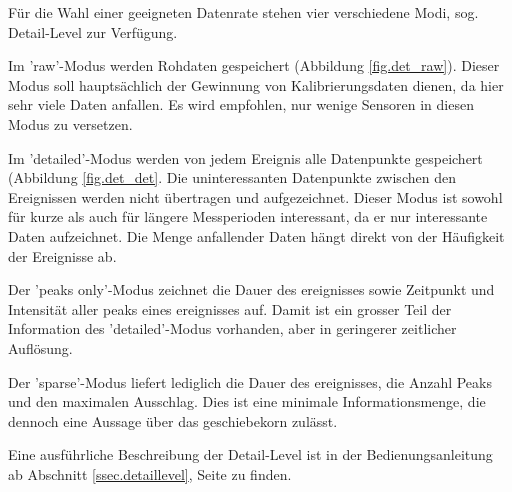 Für die Wahl einer geeigneten Datenrate stehen vier verschiedene Modi, sog. Detail-Level zur Verfügung. 

Im 'raw'-Modus werden Rohdaten gespeichert (Abbildung \ref{fig.det_raw}). Dieser Modus soll hauptsächlich der Gewinnung von Kalibrierungsdaten dienen, da hier sehr viele Daten anfallen. Es wird empfohlen, nur wenige Sensoren in diesen Modus zu versetzen.

Im 'detailed'-Modus werden von jedem Ereignis alle Datenpunkte gespeichert (Abbildung \ref{fig.det_det}. Die uninteressanten Datenpunkte zwischen den Ereignissen werden nicht übertragen und aufgezeichnet. Dieser Modus ist sowohl für kurze als auch für längere Messperioden interessant, da er nur interessante Daten aufzeichnet. Die Menge anfallender Daten hängt direkt von der Häufigkeit der Ereignisse ab.

Der 'peaks only'-Modus zeichnet die Dauer des \gls{ereignis}ses sowie Zeitpunkt und Intensität aller \gls{peak}s eines \gls{ereignis}ses auf. Damit ist ein grosser Teil der Information des 'detailed'-Modus vorhanden, aber in geringerer zeitlicher Auflösung.

Der 'sparse'-Modus liefert lediglich die Dauer des \gls{ereignis}ses, die Anzahl Peaks und den maximalen Ausschlag. Dies ist eine minimale Informationsmenge, die dennoch eine Aussage über das \gls{geschiebekorn} zulässt.

Eine ausführliche Beschreibung der Detail-Level ist in der Bedienungsanleitung ab Abschnitt \ref{ssec.detaillevel}, Seite \pageref{ssec.detaillevel} zu finden.

